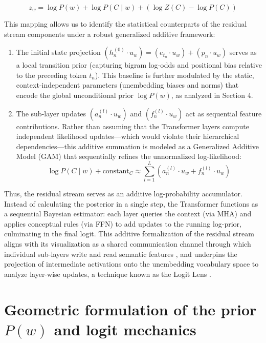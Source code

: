 \documentclass[11pt,a4paper]{article}
\begin{document}
	\begin{equation}
		\boxed{z_w = \log P(w) + \log P(C \mid w) + \left( \log Z(C) - \log P(C) \right)}
	\end{equation}
	
	This mapping allows us to identify the statistical counterparts of the residual stream components under a robust generalized additive framework:
	\begin{enumerate}
		\item The initial state projection $\left( h_n^{(0)} \cdot u_w \right) = \left( e_{t_n} \cdot u_w \right) + \left( p_n \cdot u_w \right)$ serves as a local transition prior (capturing bigram log-odds and positional bias relative to the preceding token $t_n$). This baseline is further modulated by the static, context-independent parameters (unembedding biases and norms) that encode the global unconditional prior $\log P(w)$, as analyzed in Section 4.
		\item The sub-layer updates $\left( a_n^{(l)} \cdot u_w \right)$ and $\left( f_n^{(l)} \cdot u_w \right)$ act as sequential feature contributions. Rather than assuming that the Transformer layers compute independent likelihood updates---which would violate their hierarchical dependencies---this additive summation is modeled as a Generalized Additive Model (GAM) that sequentially refines the unnormalized log-likelihood:
		\begin{equation}
			\log P(C \mid w) + \text{constant}_C \approx \sum_{l=1}^L \left( a_n^{(l)} \cdot u_w + f_n^{(l)} \cdot u_w \right)
		\end{equation}
	\end{enumerate}
	
	Thus, the residual stream serves as an additive log-probability accumulator. Instead of calculating the posterior in a single step, the Transformer functions as a sequential Bayesian estimator: each layer queries the context (via MHA) and applies conceptual rules (via FFN) to add updates to the running log-prior, culminating in the final logit. This additive formalization of the residual stream aligns with its visualization as a shared communication channel through which individual sub-layers write and read semantic features \citep{elhage2021mathematical}, and underpins the projection of intermediate activations onto the unembedding vocabulary space to analyze layer-wise updates, a technique known as the Logit Lens \citep{nostalgebraist2020logit}.
	
	\section{Geometric formulation of the prior \texorpdfstring{$P(w)$}{P(w)} and logit mechanics}
	
\end{document}
